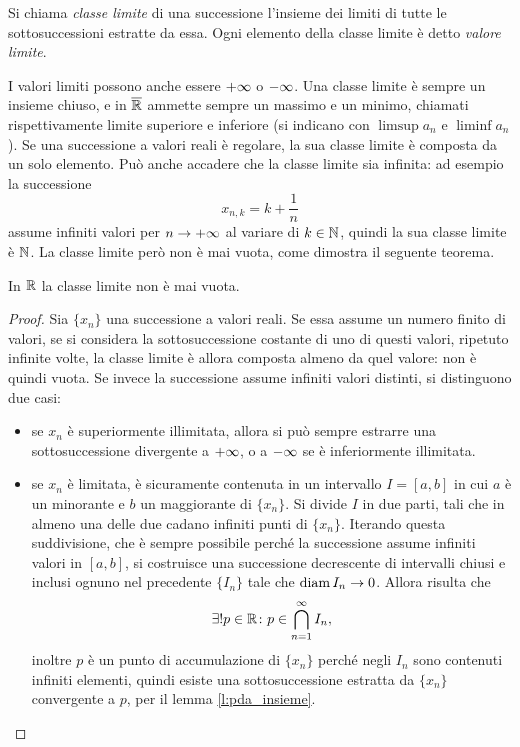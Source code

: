 \begin{definizione}
Si chiama \emph{classe limite} di una successione l'insieme dei limiti di tutte le sottosuccessioni estratte da essa. Ogni elemento della classe limite è detto \emph{valore limite}.
\end{definizione}
I valori limiti possono anche essere $+\infty$ o $-\infty$.
Una classe limite è sempre un insieme chiuso, e in $\overline{\mathbb{R}}$ ammette sempre un massimo e un minimo, chiamati rispettivamente limite superiore e inferiore (si indicano con $\limsup a_n$ e $\liminf a_n$).
Se una successione a valori reali è regolare, la sua classe limite è composta da un solo elemento. Può anche accadere che la classe limite sia infinita: ad esempio la successione
\[
x_{n,k}=k+\frac1{n}
\]
assume infiniti valori per $n\to+\infty$ al variare di $k\in\mathbb{N}$, quindi la sua classe limite è $\mathbb{N}$.
La classe limite però non è mai vuota, come dimostra il seguente teorema.
\begin{teorema}
\label{t:classe_limite_mai_vuota}
In $\mathbb{R}$ la classe limite non è mai vuota.
\end{teorema}
\begin{proof}
Sia $\{x_n\}$ una successione a valori reali. Se essa assume un numero finito di valori, se si considera la sottosuccessione costante di uno di questi valori, ripetuto infinite volte, la classe limite è allora composta almeno da quel valore: non è quindi vuota.
Se invece la successione assume infiniti valori distinti, si distinguono due casi:
\begin{itemize}
\item se $x_n$ è superiormente illimitata, allora si può sempre estrarre una sottosuccessione divergente a $+\infty$, o a $-\infty$ se è inferiormente illimitata.
\item se $x_n$ è limitata, è sicuramente contenuta in un intervallo $I=[a,b]$ in cui $a$ è un minorante e $b$ un maggiorante di $\{x_n\}$. Si divide $I$ in due parti, tali che in almeno una delle due cadano infiniti punti di $\{x_n\}$. Iterando questa suddivisione, che è sempre possibile perché la successione assume infiniti valori in $[a,b]$, si costruisce una successione decrescente di intervalli chiusi e inclusi ognuno nel precedente $\{I_n\}$ tale che $\operatorname{diam} I_n \to 0$. Allora risulta che
\[
\exists! p\in\mathbb{R}\colon p\in\bigcap_{n=1}^{\infty} I_n,
\]
inoltre $p$ è un punto di accumulazione di $\{x_n\}$ perché negli $I_n$ sono contenuti infiniti elementi, quindi esiste una sottosuccessione estratta da $\{x_n\}$ convergente a $p$, per il lemma \ref{l:pda_insieme}.\qedhere
\end{itemize}
\end{proof}
